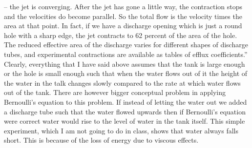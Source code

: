 -- the jet is converging. After the jet has gone a little way, the contraction stops and the velocities do become parallel. So the total flow is the velocity times the area at that point. In fact, if we have a discharge opening which is just a round hole with a sharp edge, the jet contracts to 62 percent of the area of the hole. The reduced effective area of the discharge varies for different shapes of discharge tubes, and experimental contractions are available as tables of efflux coefficients.''
Clearly, everything that I have said above assumes that the tank is large enough or the hole
is small enough such that when the water 
flows out of it the height of the water in the talk changes slowly compared to the rate at which water flows out 
of the tank.  There are however bigger conceptual problem in applying Bernoulli's equation to this problem. 
If instead of letting the water out we added a discharge tube such that the water flowed upwards then if Bernoulli's equation were
correct water would rise to the level of water in the tank itself.  This simple experiment, which I am not going to do in class,
shows that water always falls short. This is because of the loss of energy due to viscous effects. 

